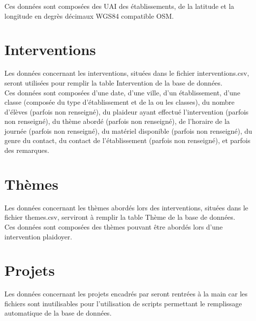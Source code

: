 	Ces données sont composées des UAI des établissements, de la latitude et la longitude en degrès décimaux WGS84 compatible OSM.
	
\section{Interventions}
	Les données concernant les interventions, situées dans le fichier interventions.csv, seront utilisées pour remplir la table Intervention de la base de données. \\
	
	Ces données sont composées d'une date, d'une ville, d'un établissement, d'une classe (composée du type d'établissement et de la ou les classes), du nombre d'élèves (parfois non renseigné), du plaideur ayant effectué l'intervention (parfois non renseigné), du thème abordé (parfois non renseigné), de l'horaire de la journée (parfois non renseigné), du matériel disponible (parfois non renseigné), du genre du contact, du contact de l'établissement (parfois non renseigné), et parfois des remarques.
	
\section{Thèmes}
	Les données concernant les thèmes abordés lors des interventions, situées dans le fichier themes.csv, serviront à remplir la table Thème de la base de données. \\
	
	Ces données sont composées des thèmes pouvant être abordés lors d'une intervention plaidoyer.
	
\section{Projets}
	Les données concernant les projets encadrés par \nomClient seront rentrées à la main car les fichiers sont inutilisables pour l'utilisation de scripts permettant le remplissage automatique de la base de données. \\
	